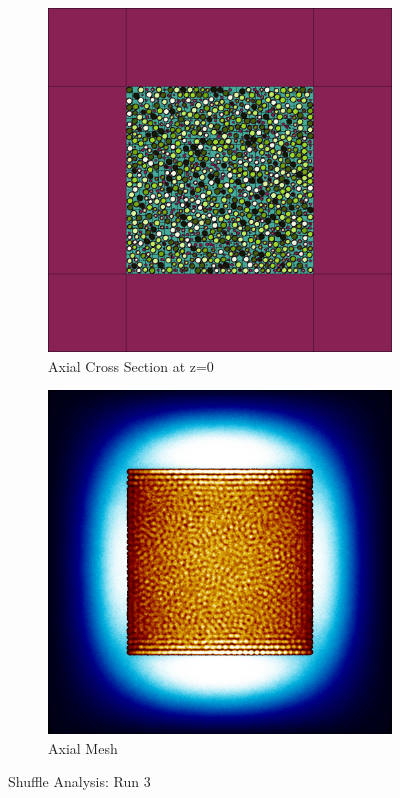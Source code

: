 \begin{figure}[H]
\begin{subfigure}{0.45\textwidth}
  \includegraphics[width=0.95\linewidth]{figures/3456012/3456012-v}
  \caption{Axial Cross Section at z=0 }
  \label{fig:3456012-v}
\end{subfigure}
%
\begin{subfigure}{0.45\textwidth}
  \includegraphics[width=0.95\linewidth]{figures/3456012/3456012-vm}
  \caption{Axial Mesh}
  \label{fig:3456012-vm}
\end{subfigure}
%
\caption{Shuffle Analysis: Run 3}
\label{fig:3456012}
\end{figure}